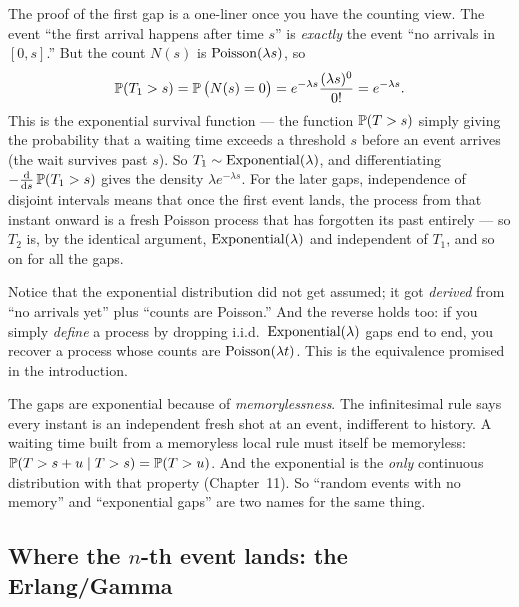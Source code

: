 \begin{whybox}
The proof of the first gap is a one-liner once you have the counting view. The
event ``the first arrival happens after time $s$'' is \emph{exactly} the event
``no arrivals in $[0,s]$.'' But the count $N(s)$ is $\Pois(\lambda s)$, so
\[
\P(T_1 > s) = \P\big(N(s) = 0\big) = e^{-\lambda s}\frac{(\lambda s)^0}{0!}
= e^{-\lambda s}.
\]
This is the exponential survival function --- the function
$\P(T > s)$ simply giving the probability that a waiting time exceeds a threshold
$s$ before an event arrives (the wait survives past $s$). So $T_1 \sim
\Expo(\lambda)$, and differentiating $-\frac{\dd}{\dd s}\P(T_1 > s)$ gives the
density $\lambda e^{-\lambda s}$.
For the later gaps, independence of disjoint intervals means that once the first
event lands, the process from that instant onward is a fresh Poisson process that
has forgotten its past entirely --- so $T_2$ is, by the identical argument,
$\Expo(\lambda)$ and independent of $T_1$, and so on for all the gaps.
\end{whybox}

Notice that the exponential distribution did not get assumed; it got
\emph{derived} from ``no arrivals yet'' plus ``counts are Poisson.'' And the
reverse holds too: if you simply \emph{define} a process by dropping i.i.d.\
$\Expo(\lambda)$ gaps end to end, you recover a process whose counts are
$\Pois(\lambda t)$. This is the equivalence promised in the introduction.

\begin{intuitionbox}
The gaps are exponential because of \emph{memorylessness}. The
infinitesimal rule says every instant is an independent fresh shot at an event,
indifferent to history. A waiting time built from a memoryless local rule must
itself be memoryless: $\P(T > s+u \given T > s) = \P(T > u)$. And the exponential
is the \emph{only} continuous distribution with that property (Chapter~11). So
``random events with no memory'' and ``exponential gaps'' are two names for the
same thing.
\end{intuitionbox}

\subsection{Where the $n$-th event lands: the Erlang/Gamma}

